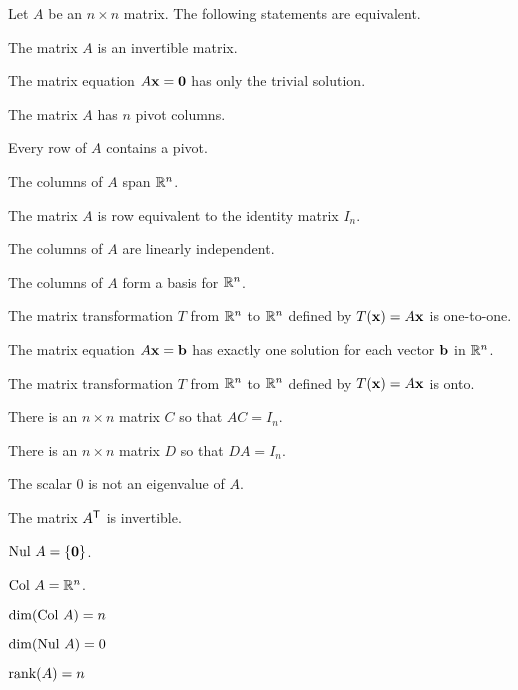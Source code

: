 \begin{theorem} \label{thm:3_d_IMT} Let $A$ be an $n \times n$ matrix. The following statements are equivalent.
\ba
\item The matrix $A$ is an invertible matrix.
\item The matrix equation $A \mathbf{x} = \mathbf{0}$ has only the trivial solution.
\item The matrix $A$ has $n$ pivot columns.
\item Every row of $A$ contains a pivot. 
\item The columns of $A$ span $\mathbb{R}^n$.
\item The matrix $A$ is row equivalent to the identity matrix $I_n$.
\item The columns of $A$ are linearly independent.
\item The columns of $A$ form a basis for $\mathbb{R}^n$.
\item The matrix transformation $T$ from $\mathbb{R}^n$ to $\mathbb{R}^n$ defined by $T(\mathbf{x}) = A\mathbf{x}$ is one-to-one.
\item The matrix equation $A \mathbf{x} = \mathbf{b}$ has exactly one solution for each vector $\mathbf{b}$ in $\mathbb{R}^n$.
\item The matrix transformation $T$ from $\mathbb{R}^n$ to $\mathbb{R}^n$ defined by $T(\mathbf{x}) = A\mathbf{x}$ is onto.
\item There is an $n \times n$ matrix $C$ so that $AC = I_n$.
\item There is an $n \times n$ matrix $D$ so that $DA = I_n$.
\item The scalar 0 is not an eigenvalue of $A$.
\item The matrix $A^{\mathsf{T}}$ is invertible.
\item $\text{Nul } A = \{\mathbf{0}\}$.
\item $\text{Col } A = \mathbb{R}^n$.
\item $\dim(\text{Col } A) = n$
\item $\dim(\text{Nul } A) = 0$
\item $\text{rank}(A) = n$
\ea
\end{theorem}



\ExampleIntro

